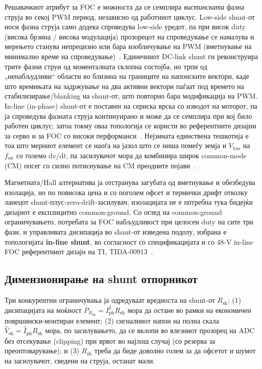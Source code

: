 \documentclass[journal,onecolumn,11pt]{IEEEtran}
\newcommand{\Vdcbus}{V_{\mathrm{bus}}}
\newcommand{\Rshunt}{R_{\mathrm{sh}}}
\newcommand{\Iphrms}{I_{\mathrm{ph}}}
\newcommand{\Fswsw}{f_{\mathrm{sw}}}
\begin{document}
Решавачкиот атрибут за FOC е можноста да се семплира \emph{вистинската} фазна струја
во секој PWM период, независно од работниот циклус. Low-side shunt-от носи фазна
струја само додека спроведува low-side уредот, па при висок duty (висока брзина /
висока модулација) прозорецот на спроведување се намалува и мерењето станува
непрецизно или бара изобличување на PWM (вметнување на минимално време на
спроведување)~\cite{ti_lowside_threephase}. Единечниот DC-link shunt ги реконструира
трите фазни струи од моменталната склопна состојба, но трпи од „ненабљудливи“ области
во близина на границите на напонските вектори, каде што времињата на задржување на
два активни вектори паѓаат под времето на стабилизирање/blanking на shunt-от, што
повторно бара модификација на PWM. In-line (in-phase) shunt-от е поставен на сериска
врска со изводот на моторот, па ја спроведува фазната струја континуирано и може да
се семплира при кој било работен циклус; затоа токму оваа топологија се користи во
референтните дизајни за серво и за FOC со високи перформанси~\cite{tida00913,ina240ds}.
Нејзината единствена тешкотија е тоа што мерниот елемент се наоѓа на јазол што се ниша
помеѓу земја и $\Vdcbus$ на $\Fswsw$ со големо $\mathrm{d}v/\mathrm{d}t$, па
засилувачот мора да комбинира широк common-mode (CM) опсег со силно потиснување на CM
преодните појави~\cite{ina240ds,tida00913}.

Магнетната/Hall алтернатива ја отстранува загубата од вметнување и обезбедува
изолација, но по повисока цена и со поголем офсет и термички дрифт отколку ланецот
shunt-плус-zero-drift-засилувач; изолацијата не е потребна тука бидејќи дизајнот е
експлицитно common-ground. Со оглед на common-ground ограничувањето, потребата за FOC
набљудливост при целосен duty на сите три фази, и управливата дисипација во shunt-от
изведена подолу, избрана е топологијата \textbf{in-line shunt}, во согласност со
спецификацијата и со \mbox{48-V} in-line FOC референтниот дизајн на TI,
TIDA-00913~\cite{tida00913}.

\subsection{Димензионирање на shunt отпорникот}\label{sec:shunt}
Три конкурентни ограничувања ја одредуваат вредноста на shunt-от $\Rshunt$: (1)
дисипацијата на моќност $P_{\Rshunt}=\Iphrms^2\Rshunt$ мора да остане во рамки на
економичен површински-монтиран елемент; (2) сигналниот напон на полна скала
$\hat V_{\mathrm{sh}}=\hat I_{\mathrm{ph}}\Rshunt$ мора, по засилувањето, да се
вклопи во влезниот прозорец на ADC без отсекување (clipping) при врвот во најлош
случај (со резерва за преоптоварување); и (3) $\Rshunt$ треба да биде доволно голем
за да офсетот и шумот на засилувачот, сведени на струја, останат мали.
\end{document}
